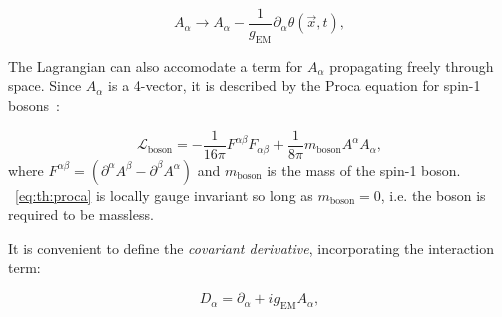 \begin{equation}
\label{eq:th:photon_gauge}
A_{\alpha} \rightarrow A_{\alpha} - \frac{1}{g_{\textrm{EM}}} \partial_{\alpha} \theta(\vec{x},t),
\end{equation}


The Lagrangian can also accomodate a term for $A_{\alpha}$ propagating freely through space. Since $A_{\alpha}$ is a 4-vector, it is described by the Proca equation for spin-1 bosons~\cite{griffiths2008introduction}:

\begin{equation}
\label{eq:th:proca}
\mathcal{L}_{\textrm{boson}} = -\frac{1}{16\pi} F^{\alpha\beta}F_{\alpha\beta} + \frac{1}{8\pi} m_{\textrm{boson}} A^{\alpha} A_{\alpha},
\end{equation}
where $F^{\alpha \beta} =(\partial^{\alpha} A^{\beta} - \partial^{\beta} A^{\alpha})$ and $m_{\textrm{boson}}$ is the mass of the spin-1 boson. 
\Eq~\ref{eq:th:proca} is locally gauge invariant so long as $m_{\textrm{boson}}=0$, i.e. the boson is required to be massless.


It is convenient to define the \emph{covariant derivative}, incorporating the interaction term:

\begin{equation}
\label{eq:th:covariant_derivative}
D_{\alpha} = \partial_{\alpha} + i g_{\textrm{EM}}A_{\alpha},
\end{equation}

